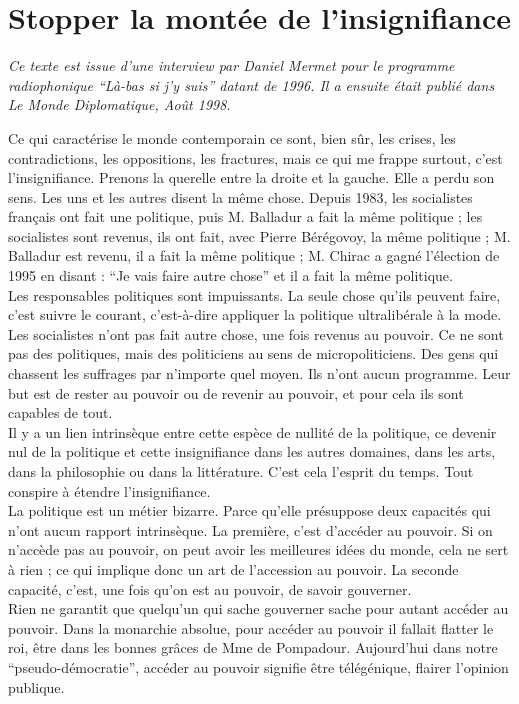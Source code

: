 \chapter{Stopper la montée de l'insignifiance}

\emph{Ce texte est issue d'une interview par Daniel Mermet pour le programme radiophonique ``L\`a-bas si j'y suis'' datant de 1996. Il a ensuite était publié dans \emph{Le Monde Diplomatique}, Août 1998.\\}

Ce qui caractérise le monde contemporain ce sont, bien sûr, les crises, les contradictions, les oppositions, les fractures, mais ce qui me frappe surtout, c’est l’insignifiance. Prenons la querelle entre la droite et la gauche. Elle a perdu son sens. Les uns et les autres disent la même chose. Depuis 1983, les socialistes français ont fait une politique, puis M. Balladur a fait la même politique ; les socialistes sont revenus, ils ont fait, avec Pierre Bérégovoy, la même politique ; M. Balladur est revenu, il a fait la même politique ; M. Chirac a gagné l’élection de 1995 en disant : ``Je vais faire autre chose'' et il a fait la même politique.\\
Les responsables politiques sont impuissants. La seule chose qu’ils peuvent faire, c’est suivre le courant, c’est-à-dire appliquer la politique ultralibérale à la mode. Les socialistes n’ont pas fait autre chose, une fois revenus au pouvoir. Ce ne sont pas des politiques, mais des politiciens au sens de micropoliticiens. Des gens qui chassent les suffrages par n’importe quel moyen. Ils n’ont aucun programme. Leur but est de rester au pouvoir ou de revenir au pouvoir, et pour cela ils sont capables de tout.\\
Il y a un lien intrinsèque entre cette espèce de nullité de la politique, ce devenir nul de la politique et cette insignifiance dans les autres domaines, dans les arts, dans la philosophie ou dans la littérature. C’est cela l’esprit du temps. Tout conspire à étendre l’insignifiance.\\
La politique est un métier bizarre. Parce qu’elle présuppose deux capacités qui n’ont aucun rapport intrinsèque. La première, c’est d’accéder au pouvoir. Si on n’accède pas au pouvoir, on peut avoir les meilleures idées du monde, cela ne sert à rien ; ce qui implique donc un art de l’accession au pouvoir. La seconde capacité, c’est, une fois qu’on est au pouvoir, de savoir gouverner.\\
Rien ne garantit que quelqu’un qui sache gouverner sache pour autant accéder au pouvoir. Dans la monarchie absolue, pour accéder au pouvoir il fallait flatter le roi, être dans les bonnes grâces de Mme de Pompadour. Aujourd’hui dans notre ``pseudo-démocratie'', accéder au pouvoir signifie être télégénique, flairer l’opinion publique.\\
